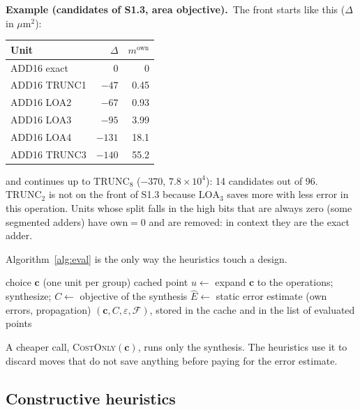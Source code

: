\documentclass[11pt,a4paper]{article}
\newcommand{\Cost}{C}
\newcommand{\Feas}{\mathcal{F}}
\newcommand{\examplebox}[2]{\par\medskip\noindent\colorbox{tabAzul!6}{\begin{minipage}{\dimexpr\linewidth-2\fboxsep}
  \textbf{Example (#1).}\ #2\end{minipage}}\par\medskip}
\begin{document}
\examplebox{candidates of S1.3, area objective}{The front starts like this ($\Delta$ in $\mu\text{m}^2$):
\begin{center}
\rowcolors{2}{gray!10}{white}
\begin{tabular}{|l|r|r|}
\hline
\rowcolor{tabAzul}\color{white} Unit & \color{white} $\Delta$ & \color{white} $m^{\text{own}}$ \\
\hline
ADD16 exact & 0 & 0 \\
ADD16 TRUNC1 & $-47$ & 0.45 \\
ADD16 LOA2 & $-67$ & 0.93 \\
ADD16 LOA3 & $-95$ & 3.99 \\
ADD16 LOA4 & $-131$ & 18.1 \\
ADD16 TRUNC3 & $-140$ & 55.2 \\
\hline
\end{tabular}
\end{center}
and continues up to $\text{TRUNC}_8$ ($-370$, $7.8 \times 10^4$): 14 candidates out of 96. $\text{TRUNC}_2$ is not on
the front of S1.3 because $\text{LOA}_3$ saves more with less error in this operation. Units whose split falls in the
high bits that are always zero (some segmented adders) have $\text{own} = 0$ and are removed: in context they are the
exact adder.}

Algorithm~\ref{alg:eval} is the only way the heuristics touch a design.

\begin{algorithm}[H]
\caption{Evaluate}\label{alg:eval}
\begin{algorithmic}[1]
\Require choice $\mathbf{c}$ (one unit per group)
 \Return cached point
\EndIf
\State $u \gets$ expand $\mathbf{c}$ to the operations; synthesize; $\Cost \gets$ objective of the synthesis
\State $\hat E \gets$ static error estimate (own errors, propagation)
\State \Return $(\mathbf{c}, \Cost, \varepsilon, \Feas)$, stored in the cache and in the list of evaluated points
\end{algorithmic}
\end{algorithm}

A cheaper call, \textsc{CostOnly}$(\mathbf{c})$, runs only the synthesis. The heuristics use it to discard moves that
do not save anything before paying for the error estimate.

\subsection{Constructive heuristics}
\end{document}
